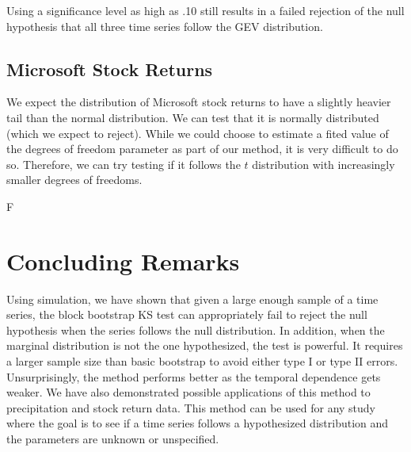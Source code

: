\documentclass[12pt, letterpaper]{article}
\newcommand{\mc}[1]{\textcolor{green}{MC: (#1)}}
\begin{document}


Using a significance level as high as .10 still results in a failed rejection
of the null hypothesis that all three time series follow the GEV distribution.

\subsection{Microsoft Stock Returns}


We expect the distribution of Microsoft stock returns to have a slightly
heavier tail than the normal distribution. We can test that it is normally
distributed (which we expect to reject).  While we 
could choose to estimate a fited value of the degrees of freedom parameter as
part of our method, it is very difficult to do so. Therefore, we can try testing 
if it follows
the $t$ distribution with increasingly smaller degrees of freedoms.



F

\section{Concluding Remarks}
\label{sec:conclusion}

Using simulation, we have shown that given a large enough sample of a time 
series, the block 
bootstrap KS test can appropriately fail to reject the null hypothesis when the
series follows the null distribution. In addition, when the marginal
distribution is not
the one hypothesized, the test is powerful. It requires a larger sample size 
than basic bootstrap to avoid either type I or type II errors. Unsurprisingly,
the method performs better as the temporal dependence gets weaker. We have also 
demonstrated possible applications of this method to precipitation and 
stock return data. This method can be used for any study where the goal is
to see if a time series follows a hypothesized distribution and the parameters
are unknown or unspecified. 







\end{document}
